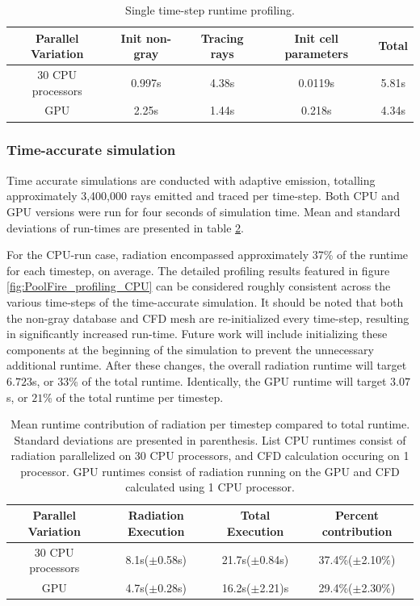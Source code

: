 \begin{table}[h!]
\centering
\begin{tabular}{||c c c c c||} 
 \hline
 Parallel Variation & Init non-gray & Tracing rays & Init cell parameters & Total \\ [0.5ex] 
 \hline\hline
 30 CPU processors & 0.997s & 4.38s & 0.0119s & 5.81s \\
 GPU & 2.25s & 1.44s & 0.218s & 4.34s \\ 
 \hline
\end{tabular}
\caption{Single time-step runtime profiling.}
\label{table:PoolFireTimestep_runtime_table_1rpc}
\end{table}

\subsubsection{Time-accurate simulation}
Time accurate simulations are  conducted with adaptive emission, totalling approximately 3,400,000 rays emitted and traced per time-step.
Both CPU and GPU versions were run for four seconds of simulation time. Mean and standard deviations of run-times are presented in table \ref{table:PoolFireTransient_runtime_table_1rpc}. 

For the CPU-run case, radiation encompassed approximately 37\% of the runtime for each timestep, on average. The detailed profiling results featured in figure \ref{fig:PoolFire_profiling_CPU} can be considered roughly consistent across the various time-steps of the time-accurate simulation.
It should be noted that both the non-gray database and CFD mesh are re-initialized every time-step, resulting in significantly increased run-time. Future work will include initializing these components at the beginning of the simulation to prevent the unnecessary additional runtime.
After these changes, the overall radiation runtime will target $6.723$s, or $33$\% of the total runtime.
Identically, the GPU runtime will target $3.07$s, or $21$\% of the total runtime per timestep.

\begin{table}[h!]
\centering
\begin{tabular}{||c c c c||} 
 \hline
 Parallel Variation & Radiation Execution & Total Execution & Percent contribution \\ [0.5ex] 
 \hline\hline
 30 CPU processors & 8.1s($\pm{}$0.58s) & 21.7s($\pm{}$0.84s) & 37.4\%($\pm{}$2.10\%) \\ 
 GPU & 4.7s($\pm$0.28s) & 16.2s($\pm$2.21)s & 29.4\%($\pm$2.30\%) \\
 \hline
\end{tabular}
\caption{Mean runtime contribution of radiation per timestep compared to total runtime. Standard deviations are presented in parenthesis. List CPU runtimes consist of radiation parallelized on 30 CPU processors, and CFD calculation occuring on 1 processor. GPU runtimes consist of radiation running on the GPU and CFD calculated using 1 CPU processor.}
\label{table:PoolFireTransient_runtime_table_1rpc}
\end{table}


